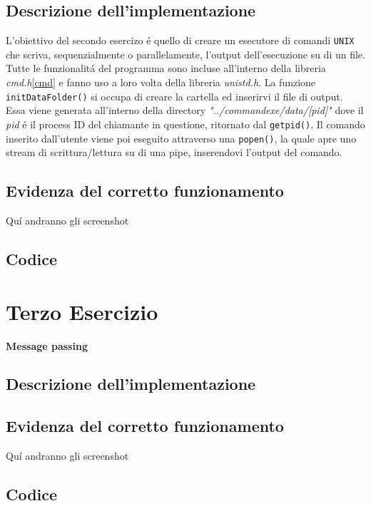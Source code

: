 \documentclass[a4paper]{article}
\begin{document}
\subsection{Descrizione dell'implementazione}
L'obiettivo del secondo esercizo \'e quello di creare un esecutore di comandi \texttt{UNIX} che scriva, sequenzialmente o parallelamente, l'output dell'esecuzione su di un file. \\
Tutte le funzionalit\'a del programma sono incluse all'interno della libreria \textit{cmd.h}\ref{cmd} e fanno uso a loro volta della libreria \textit{unistd.h}.
La funzione \texttt{initDataFolder()} si occupa di creare la cartella ed inserirvi il file di output. Essa viene generata all'interno della directory \textit{"../commandexe/data/[pid]"} dove il \textit{pid} \'e il process ID del chiamante in questione, ritornato dal \texttt{getpid()}.
Il comando inserito dall'utente viene poi eseguito attraverso una \texttt{popen()}, la quale apre uno stream di scrittura/lettura su di una pipe, inserendovi l'output del comando.
\subsection{Evidenza del corretto funzionamento}
Qu\'i andranno gli screenshot
\subsection{Codice}


\newpage
\section{Terzo Esercizio}
\textbf{Message passing}
\subsection{Descrizione dell'implementazione}
\subsection{Evidenza del corretto funzionamento}
Qu\'i andranno gli screenshot
\subsection{Codice}
\end{document}
